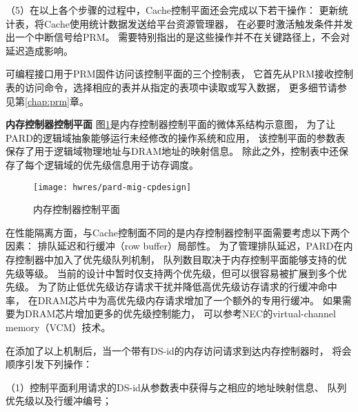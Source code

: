 （5）在以上各个步骤的过程中，Cache控制平面还会完成以下若干操作：
更新统计表，将Cache使用统计数据发送给平台资源管理器，
在必要时激活触发条件并发出一个中断信号给PRM。
需要特别指出的是这些操作并不在关键路径上，不会对延迟造成影响。

可编程接口用于PRM固件访问该控制平面的三个控制表，
它首先从PRM接收控制表的访问命令，选择相应的表并从指定的表项中读取或写入数据，
更多细节请参见第\ref{chap:prm}章。


\textbf{内存控制器控制平面}\quad
图\ref{fig:pard-mig-cpdesign}是内存控制器控制平面的微体系结构示意图，
为了让PARD的逻辑域抽象能够运行未经修改的操作系统和应用，
该控制平面的参数表保存了用于逻辑域物理地址与DRAM地址的映射信息。
除此之外，控制表中还保存了每个逻辑域的优先级信息用于访存调度。

\begin{figure}[tb]
  \centering
  \texttt{[image: hwres/pard-mig-cpdesign]}
  \caption{内存控制器控制平面}
  \label{fig:pard-mig-cpdesign}
\end{figure}


在性能隔离方面，与Cache控制面不同的是内存控制器控制平面需要考虑以下两个因素：
排队延迟和行缓冲（row buffer）局部性。
为了管理排队延迟，PARD在内存控制器中加入了优先级队列机制，
队列数目取决于内存控制平面能够支持的优先级等级。
当前的设计中暂时仅支持两个优先级，但可以很容易被扩展到多个优先级。
为了防止低优先级访存请求干扰并降低高优先级访存请求的行缓冲命中率，
在DRAM芯片中为高优先级内存请求增加了一个额外的专用行缓冲。
如果需要为DRAM芯片增加更多的优先级控制能力，
可以参考NEC的virtual-channel memory（VCM）\cite{nec-vcm}技术。

在添加了以上机制后，当一个带有DS-id的内存访问请求到达内存控制器时，
将会顺序引发下列操作：

（1）控制平面利用请求的DS-id从参数表中获得与之相应的地址映射信息、
队列优先级以及行缓冲编号；


